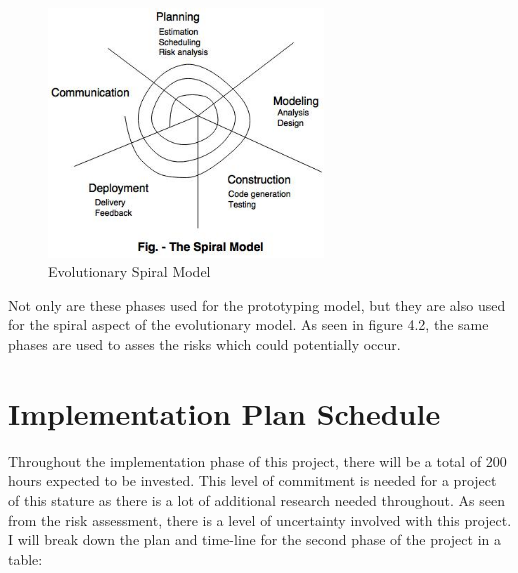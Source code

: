 \vspace{5mm}

\begin{figure}
    \centering
     \includegraphics[width=0.65\textwidth]{Figures/SpiralModel.jpg}
  \caption[spiral model]{Evolutionary Spiral Model \cite{Reference19}}
 \label{fig:Spiral Model}
\end{figure}

\pagebreak

Not only are these phases used for the prototyping model, but they are also used for the spiral aspect of the evolutionary model. As seen in figure 4.2, the same phases are used to asses the risks which could potentially occur. 


\section{Implementation Plan Schedule}

Throughout the implementation phase of this project, there will be a total of 200 hours expected to be invested. This level of commitment is needed for a project of this stature as there is a lot of additional research needed throughout. As seen from the risk assessment, there is a level of uncertainty involved with this project. I will break down the plan and time-line for the second phase of the project in a table:

